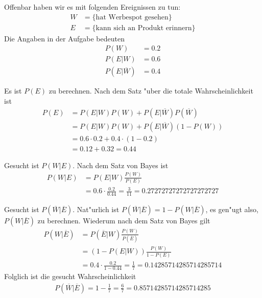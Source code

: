 \begin{loesung}
Offenbar haben wir es mit folgenden Ereignissen zu tun:
\begin{align*}
W&=\{\text{hat Werbespot gesehen}\}
\\
E&=\{\text{kann sich an Produkt erinnern}\}
\end{align*}
Die Angaben in der Aufgabe bedeuten
\begin{align*}
P(W)&=0.2\\
P(E|W)&=0.6\\
P(E|\overline W)&=0.4
\end{align*}
\begin{teilaufgaben}
\item Es ist $P(E)$ zu berechnen. Nach dem Satz "uber die totale
Wahrscheinlichkeit ist
\begin{align*}
P(E)&=P(E|W)P(W)+P(E|\overline W)P(\overline W)\\
&=P(E|W)P(W)+P(E|\overline W)(1-P(W))\\
&=0.6\cdot 0.2+0.4\cdot (1-0.2)\\
&=0.12+0.32=0.44
\end{align*}
\item Gesucht ist $P(W|E)$. Nach dem Satz von Bayes ist
\begin{align*}
P(W|E)&=P(E|W)\frac{P(W)}{P(E)}\\
&=0.6\cdot\frac{0.2}{0.44}=\frac{3}{11}
= 0.27272727272727272727
\end{align*}
\item Gesucht ist $P(\overline W|\overline E)$. Nat"urlich ist
$P(\overline W|\overline E)=1-P(W|\overline E)$, es gen"ugt also,
$P(W|\overline E)$ zu berechnen. Wiederum nach dem Satz von Bayes
gilt
\begin{align*}
P(W|\overline E)
&=
P(\overline E|W)\frac{P(W)}{P(\overline E)}\\
&=
(1-P(E|W))\frac{P(W)}{1-P(E)}\\
&=
0.4\cdot\frac{0.2}{1-0.44}=\frac17
=
0.14285714285714285714
\end{align*}
Folglich ist die gesucht Wahrscheinlichkeit
\begin{align*}
P(\overline W|\overline E)=1-\frac17=\frac67=
0.85714285714285714285
\end{align*}
\end{teilaufgaben}
\end{loesung}


